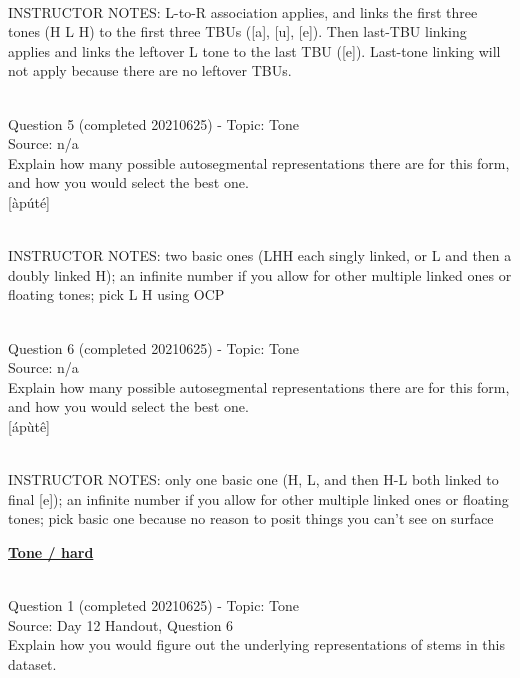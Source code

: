 \documentclass[12pt]{article}
\begin{document}
~\\
INSTRUCTOR NOTES: L-to-R association applies, and links the first three tones (H L H) to the first three TBUs ([a], [u], [e]). Then last-TBU linking applies and links the leftover L tone to the last TBU ([e]). Last-tone linking will not apply because there are no leftover TBUs.


~\\

{\large Question 5} (completed 20210625) - Topic: Tone\\
Source: n/a\\

Explain how many possible autosegmental representations there are for this form, and how you would select the best one.\\

{[àpúté]}


~\\
INSTRUCTOR NOTES: two basic ones (LHH each singly linked, or L and then a doubly linked H); an infinite number if you allow for other multiple linked ones or floating tones; pick L H using OCP


~\\

{\large Question 6} (completed 20210625) - Topic: Tone\\
Source: n/a\\

Explain how many possible autosegmental representations there are for this form, and how you would select the best one.\\

{[ápùtê]}


~\\
INSTRUCTOR NOTES: only one basic one (H, L, and then H-L both linked to final [e]); an infinite number if you allow for other multiple linked ones or floating tones; pick basic one because no reason to posit things you can't see on surface


\newpage\textbf{\underline{\huge Tone / hard\\}}

~\\

{\large Question 1} (completed 20210625) - Topic: Tone\\
Source: Day 12 Handout, Question 6\\

Explain how you would figure out the underlying representations of stems in this dataset.\\
\end{document}
